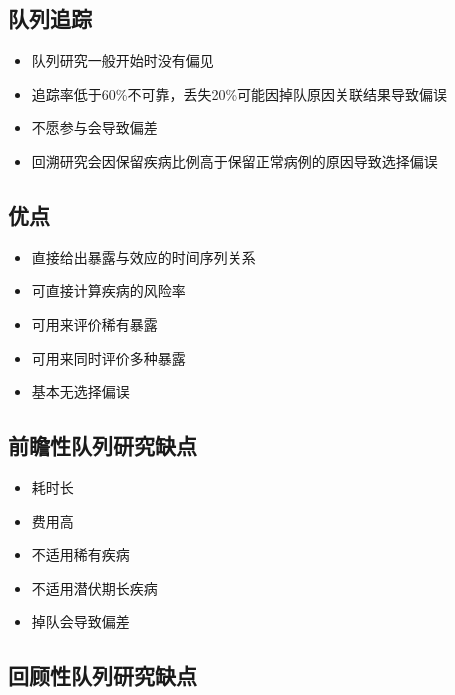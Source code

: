 \documentclass[]{book}
\providecommand{\tightlist}{%
  \setlength{\itemsep}{0pt}\setlength{\parskip}{0pt}}
\begin{document}
\hypertarget{ux961fux5217ux8ffdux8e2a}{%
\subsection{队列追踪}\label{ux961fux5217ux8ffdux8e2a}}

\begin{itemize}
\tightlist
\item
  队列研究一般开始时没有偏见
\item
  追踪率低于60\%不可靠，丢失20\%可能因掉队原因关联结果导致偏误
\item
  不愿参与会导致偏差
\item
  回溯研究会因保留疾病比例高于保留正常病例的原因导致选择偏误
\end{itemize}

\hypertarget{ux4f18ux70b9}{%
\subsection{优点}\label{ux4f18ux70b9}}

\begin{itemize}
\tightlist
\item
  直接给出暴露与效应的时间序列关系
\item
  可直接计算疾病的风险率
\item
  可用来评价稀有暴露
\item
  可用来同时评价多种暴露
\item
  基本无选择偏误
\end{itemize}

\hypertarget{ux524dux77bbux6027ux961fux5217ux7814ux7a76ux7f3aux70b9}{%
\subsection{前瞻性队列研究缺点}\label{ux524dux77bbux6027ux961fux5217ux7814ux7a76ux7f3aux70b9}}

\begin{itemize}
\tightlist
\item
  耗时长
\item
  费用高
\item
  不适用稀有疾病
\item
  不适用潜伏期长疾病
\item
  掉队会导致偏差
\end{itemize}

\hypertarget{ux56deux987eux6027ux961fux5217ux7814ux7a76ux7f3aux70b9}{%
\subsection{回顾性队列研究缺点}\label{ux56deux987eux6027ux961fux5217ux7814ux7a76ux7f3aux70b9}}
\end{document}
